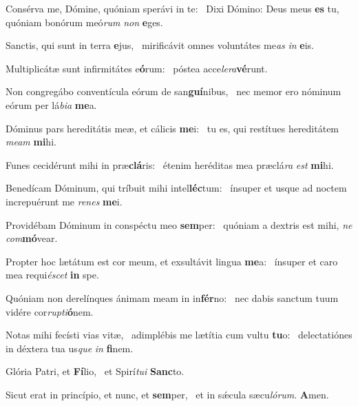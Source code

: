 \item Consérva me, Dómine, quóniam sperávi in te:~\pscross{} Dixi Dómino: Deus meus \textbf{es} tu,~\psstar{} quóniam bonórum meó\textit{rum} \textit{non} \textbf{e}ges.
\item Sanctis, qui sunt in terra \textbf{e}jus,~\psstar{} mirificávit omnes voluntátes me\textit{as} \textit{in} \textbf{e}is.
\item Multiplicátæ sunt infirmitátes e\textbf{ó}rum:~\psstar{} póstea acce\textit{lera}\textbf{vé}runt.
\item Non congregábo conventícula eórum de san\textbf{guí}nibus,~\psstar{} nec memor ero nóminum eórum per lá\textit{bia} \textbf{me}a.
\item Dóminus pars hereditátis meæ, et cálicis \textbf{me}i:~\psstar{} tu es, qui restítues hereditátem \textit{meam} \textbf{mi}hi.
\item Funes cecidérunt mihi in præ\textbf{clá}ris:~\psstar{} étenim heréditas mea præclá\textit{ra} \textit{est} \textbf{mi}hi.
\item Benedícam Dóminum, qui tríbuit mihi intel\textbf{léc}tum:~\psstar{} ínsuper et usque ad noctem increpuérunt me \textit{renes} \textbf{me}i.
\item Providébam Dóminum in conspéctu meo \textbf{sem}per:~\psstar{} quóniam a dextris est mihi, \textit{ne} \textit{com}\textbf{mó}vear.
\item Propter hoc lætátum est cor meum, et exsultávit lingua \textbf{me}a:~\psstar{} ínsuper et caro mea requi\textit{éscet} \textbf{in} spe.
\item Quóniam non derelínques ánimam meam in in\textbf{fér}no:~\psstar{} nec dabis sanctum tuum vidére cor\textit{rupti}\textbf{ó}nem.
\item Notas mihi fecísti vias vitæ,~\pscross{} adimplébis me lætítia cum vultu \textbf{tu}o:~\psstar{} delectatiónes in déxtera tua us\textit{que} \textit{in} \textbf{fi}nem.
\item Glória Patri, et \textbf{Fí}lio,~\psstar{} et Spirí\textit{tui} \textbf{Sanc}to.
\item Sicut erat in princípio, et nunc, et \textbf{sem}per,~\psstar{} et in sǽcula sæcu\textit{lórum}. \textbf{A}men.
